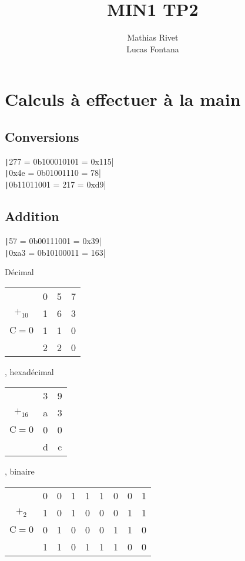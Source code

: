 \documentclass[french, 12pt, a4paper]{article}
\title{MIN1 TP2}
\author{
	Mathias Rivet\\
	Lucas Fontana
}
\begin{document}
	\maketitle



\section{Calculs à effectuer à la main}

\subsection{Conversions}

\texttt|277 = 0b100010101 = 0x115|	\\
\texttt|0x4e = 0b01001110 = 78|		\\
\texttt|0b11011001 = 217 = 0xd9|



\subsection{Addition}

\texttt|57 = 0b00111001 = 0x39|	\\
\texttt|0xa3 = 0b10100011 = 163|

Décimal
\begin{tabular}[c]{cccc}
					& 0 & 5 & 7	\\
$+_{10}$			& 1 & 6 & 3 \\
$\mathrm{C} = 0$	& 1 & 1 & 0 \\	\cline{2-4}
					& 2 & 2 & 0 \\
\end{tabular}
, hexadécimal
\begin{tabular}[c]{ccc}
					& 3 & 9	\\
$+_{16}$			& a & 3 \\
$\mathrm{C} = 0$	& 0 & 0 \\	\cline{2-3}
					& d & c \\
\end{tabular}
, binaire
\begin{tabular}[c]{ccccccccc}
					& 0 & 0 & 1 & 1	& 1 & 0 & 0 & 1	\\
$+_2$				& 1 & 0 & 1 & 0 & 0 & 0 & 1 & 1	\\
$\mathrm{C} = 0$ 	& 0 & 1 & 0 & 0 & 0 & 1 & 1 & 0	\\	\cline{2-9}
					& 1 & 1 & 0 & 1 & 1 & 1 & 0 & 0	\\
\end{tabular}
\end{document}
